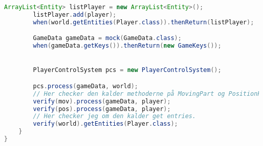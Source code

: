 \begin{lstlisting}[caption={dk.sdu.mmmi.cbse.playersystem.PlayerControlSystemTest.java}, label={lst:PlayerControlSystemTest.java}, language=java, firstnumber=1]
        ArrayList<Entity> listPlayer = new ArrayList<Entity>();
        listPlayer.add(player);
        when(world.getEntities(Player.class)).thenReturn(listPlayer);

        GameData gameData = mock(GameData.class);
        when(gameData.getKeys()).thenReturn(new GameKeys());


        PlayerControlSystem pcs = new PlayerControlSystem();

        pcs.process(gameData, world);
        // Her checker den kalder methoderne på MovingPart og PositionPart
        verify(mov).process(gameData, player);
        verify(pos).process(gameData, player);
        // Her checker jeg om den kalder get entries.
        verify(world).getEntities(Player.class);
    }
}
\end{lstlisting}
